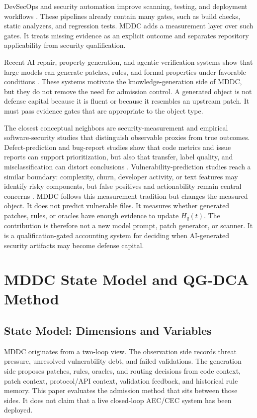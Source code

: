 ﻿\documentclass[lettersize,journal]{IEEEtran}
\begin{document}
DevSecOps and security automation improve scanning, testing, and deployment workflows \cite{rw_devsecops_scan,rw_supplychain}. These pipelines already contain many gates, such as build checks, static analyzers, and regression tests. MDDC adds a measurement layer over such gates. It treats missing evidence as an explicit outcome and separates repository applicability from security qualification.

Recent AI repair, property generation, and agentic verification systems show that large models can generate patches, rules, and formal properties under favorable conditions \cite{ref_patchagent,ref_propertygpt}. These systems motivate the knowledge-generation side of MDDC, but they do not remove the need for admission control. A generated object is not defense capital because it is fluent or because it resembles an upstream patch. It must pass evidence gates that are appropriate to the object type.

The closest conceptual neighbors are security-measurement and empirical software-security studies that distinguish observable proxies from true outcomes. Defect-prediction and bug-report studies show that code metrics and issue reports can support prioritization, but also that transfer, label quality, and misclassification can distort conclusions \cite{ref_menzies_defect,ref_zimmermann_cpdp,ref_bettenburg_bugreport,ref_herzig_misclassification}. Vulnerability-prediction studies reach a similar boundary: complexity, churn, developer activity, or text features may identify risky components, but false positives and actionability remain central concerns \cite{ref_shin_vulnerability_metrics,ref_morrison_vpm}. MDDC follows this measurement tradition but changes the measured object. It does not predict vulnerable files. It measures whether generated patches, rules, or oracles have enough evidence to update $H_q(t)$. The contribution is therefore not a new model prompt, patch generator, or scanner. It is a qualification-gated accounting system for deciding when AI-generated security artifacts may become defense capital.

\section{MDDC State Model and QG-DCA Method}
\subsection{State Model: Dimensions and Variables}
MDDC originates from a two-loop view. The observation side records threat pressure, unresolved vulnerability debt, and failed validations. The generation side proposes patches, rules, oracles, and routing decisions from code context, patch context, protocol/API context, validation feedback, and historical rule memory. This paper evaluates the admission method that sits between those sides. It does not claim that a live closed-loop AEC/CEC system has been deployed.
\end{document}
